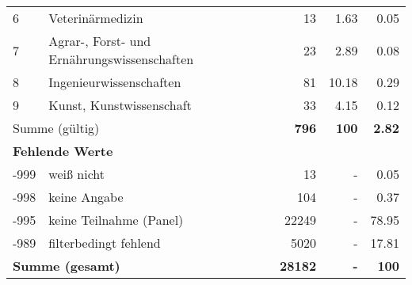 \begin{longtable}{lXrrr}
     6 &
     \multicolumn{1}{X}{ Veterinärmedizin   } &


       \num{13} &
       \num[round-mode=places,round-precision=2]{1.63} &
         \num[round-mode=places,round-precision=2]{0.05} \\

     7 &
     \multicolumn{1}{X}{ Agrar-, Forst- und Ernährungswissenschaften   } &


       \num{23} &
       \num[round-mode=places,round-precision=2]{2.89} &
         \num[round-mode=places,round-precision=2]{0.08} \\

     8 &
     \multicolumn{1}{X}{ Ingenieurwissenschaften   } &


       \num{81} &
       \num[round-mode=places,round-precision=2]{10.18} &
         \num[round-mode=places,round-precision=2]{0.29} \\

     9 &
     \multicolumn{1}{X}{ Kunst, Kunstwissenschaft   } &


       \num{33} &
       \num[round-mode=places,round-precision=2]{4.15} &
         \num[round-mode=places,round-precision=2]{0.12} \\
     \midrule
     \multicolumn{2}{l}{Summe (gültig)} &
       \textbf{\num{796}} &
     \textbf{100} &
       \textbf{\num[round-mode=places,round-precision=2]{2.82}} \\
     \multicolumn{5}{l}{\textbf{Fehlende Werte}}\\
       -999 &
       weiß nicht &
         \num{13} &
        - &
         \num[round-mode=places,round-precision=2]{0.05} \\
       -998 &
       keine Angabe &
         \num{104} &
        - &
         \num[round-mode=places,round-precision=2]{0.37} \\
       -995 &
       keine Teilnahme (Panel) &
         \num{22249} &
        - &
         \num[round-mode=places,round-precision=2]{78.95} \\
       -989 &
       filterbedingt fehlend &
         \num{5020} &
        - &
         \num[round-mode=places,round-precision=2]{17.81} \\
     \midrule
     \multicolumn{2}{l}{\textbf{Summe (gesamt)}} &
          \textbf{\num{28182}} &
        \textbf{-} &
        \textbf{100} \\
     \bottomrule
     \end{longtable}
     
